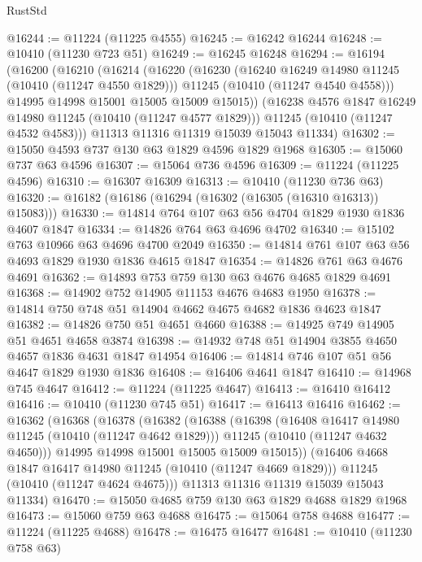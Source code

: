 \begin{lexlean}{RustStd}
\begin{coremodule}
@16244 := @11224 (@11225 @4555)
@16245 := @16242 @16244
@16248 := @10410 (@11230 @723 @51)
@16249 := @16245 @16248
@16294 := @16194
    (@16200
      (@16210
        (@16214
          (@16220
            (@16230
              (@16240 @16249 @14980 @11245 (@10410 (@11247 @4550 @1829)))
              @11245
              (@10410 (@11247 @4540 @4558)))
            @14995
            @14998
            @15001
            @15005
            @15009
            @15015))
        (@16238 @4576 @1847 @16249 @14980 @11245 (@10410 (@11247 @4577 @1829)))
        @11245
        (@10410 (@11247 @4532 @4583)))
      @11313
      @11316
      @11319
      @15039
      @15043
      @11334)
@16302 := @15050 @4593 @737 @130 @63 @1829 @4596 @1829 @1968
@16305 := @15060 @737 @63 @4596
@16307 := @15064 @736 @4596
@16309 := @11224 (@11225 @4596)
@16310 := @16307 @16309
@16313 := @10410 (@11230 @736 @63)
@16320 := @16182 (@16186 (@16294 (@16302 (@16305 (@16310 @16313)) @15083)))
@16330 := @14814 @764 @107 @63 @56 @4704 @1829 @1930 @1836 @4607 @1847
@16334 := @14826 @764 @63 @4696 @4702
@16340 := @15102 @763 @10966 @63 @4696 @4700 @2049
@16350 := @14814 @761 @107 @63 @56 @4693 @1829 @1930 @1836 @4615 @1847
@16354 := @14826 @761 @63 @4676 @4691
@16362 := @14893 @753 @759 @130 @63 @4676 @4685 @1829 @4691
@16368 := @14902 @752 @14905 @11153 @4676 @4683 @1950
@16378 := @14814 @750 @748 @51 @14904 @4662 @4675 @4682 @1836 @4623 @1847
@16382 := @14826 @750 @51 @4651 @4660
@16388 := @14925 @749 @14905 @51 @4651 @4658 @3874
@16398 := @14932 @748 @51 @14904 @3855 @4650 @4657 @1836 @4631 @1847 @14954
@16406 := @14814 @746 @107 @51 @56 @4647 @1829 @1930 @1836
@16408 := @16406 @4641 @1847
@16410 := @14968 @745 @4647
@16412 := @11224 (@11225 @4647)
@16413 := @16410 @16412
@16416 := @10410 (@11230 @745 @51)
@16417 := @16413 @16416
@16462 := @16362
    (@16368
      (@16378
        (@16382
          (@16388
            (@16398
              (@16408 @16417 @14980 @11245 (@10410 (@11247 @4642 @1829)))
              @11245
              (@10410 (@11247 @4632 @4650)))
            @14995
            @14998
            @15001
            @15005
            @15009
            @15015))
        (@16406 @4668 @1847 @16417 @14980 @11245 (@10410 (@11247 @4669 @1829)))
        @11245
        (@10410 (@11247 @4624 @4675)))
      @11313
      @11316
      @11319
      @15039
      @15043
      @11334)
@16470 := @15050 @4685 @759 @130 @63 @1829 @4688 @1829 @1968
@16473 := @15060 @759 @63 @4688
@16475 := @15064 @758 @4688
@16477 := @11224 (@11225 @4688)
@16478 := @16475 @16477
@16481 := @10410 (@11230 @758 @63)

\end{coremodule}
\end{lexlean}
